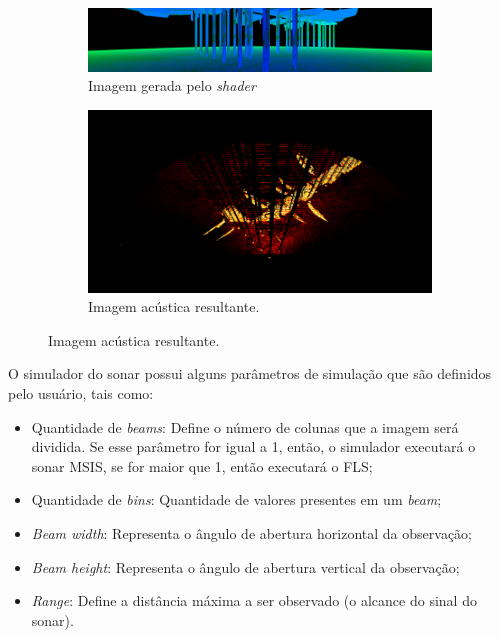 \begin{figure}[H]
    \centering
    \caption{Imagens correspondentes geradas pelo \textit{GPU Sonar Simulator}}
    \label{fig:shader_output}
    \begin{subfigure}[t]{0.5\textwidth}
        \includegraphics[width=\textwidth]{dados/figuras/shader_output1.png}
        \caption{Imagem gerada pelo \textit{shader}}
    \end{subfigure}
    \begin{subfigure}[t]{0.5\textwidth}
        \includegraphics[width=\textwidth]{dados/figuras/shader_output2.png}
        \caption{Imagem acústica resultante.}
    \end{subfigure}
\end{figure}

O simulador do sonar possui alguns parâmetros de simulação que são definidos pelo usuário, tais como:

\begin{itemize}
    \item Quantidade de \textit{beams}: Define o número de colunas que a imagem será dividida. Se esse parâmetro for igual a 1, então, o simulador executará o sonar MSIS, se for maior que 1, então executará o FLS;
    \item Quantidade de \textit{bins}: Quantidade de valores presentes em um \textit{beam};
    \item \textit{Beam width}: Representa o ângulo de abertura horizontal da observação;
    \item \textit{Beam height}: Representa o ângulo de abertura vertical da observação;
    \item \textit{Range}: Define a distância máxima a ser observado (o alcance do sinal do sonar).
\end{itemize}
\hspace{1em}

